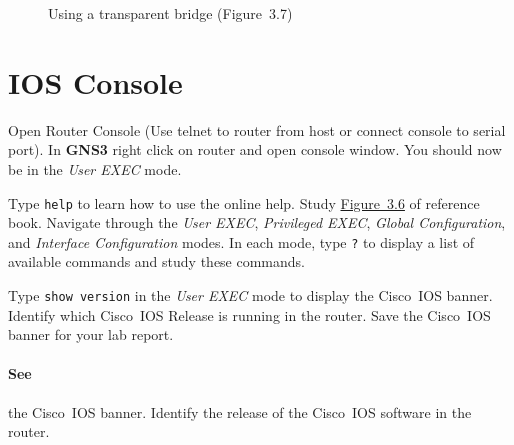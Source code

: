 \documentclass{../UTNetLab}
\begin{document}
    \begin{figure}[H]
        \centering
        \caption{Using a transparent bridge (Figure~3.7)}\label{fig:3.7}
    \end{figure}


\section{IOS Console}
    Open Router Console (Use telnet to router from host or connect console to serial port).
    In \textbf{GNS3} right click on router and open console window.
    You should now be in the \textit{User EXEC} mode.

    Type \lstinline[language={cisco}]{help} to learn how to use the online help.
    Study \hyperref[fig:3.6]{Figure~3.6} of reference book.
    Navigate through the \textit{User EXEC}, \textit{Privileged EXEC}, \textit{Global Configuration}, and \textit{Interface Configuration} modes.
    In each mode, type \lstinline[language={cisco}]{?} to display a list of available commands and study these commands.

    Type \lstinline[language={cisco}]{show version} in the \textit{User EXEC} mode to display the Cisco~IOS banner.
    Identify which Cisco~IOS Release is running in the router.
    Save the Cisco~IOS banner for your lab report.
    
    \paragraph{See} the Cisco~IOS banner.
    Identify the release of the Cisco~IOS software in the router.
\end{document}
